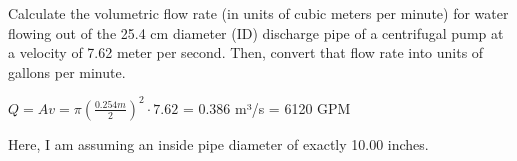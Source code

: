 

Calculate the volumetric flow rate (in units of cubic meters per minute) for water flowing out of the 25.4 cm diameter (ID) discharge pipe of a centrifugal pump at a velocity of 7.62 meter per second.  Then, convert that flow rate into units of gallons per minute.







$Q=Av=\pi(\frac{0.254m}{2})^2\cdot 7.62$ = 0.386 m³/s = 6120 GPM







Here, I am assuming an inside pipe diameter of exactly 10.00 inches.





